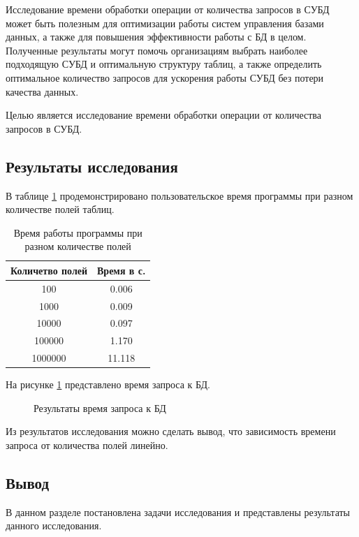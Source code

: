 Исследование времени обработки операции от количества запросов в СУБД может быть полезным для оптимизации работы систем управления базами данных, а также для повышения эффективности работы с БД в целом. Полученные результаты могут помочь организациям выбрать наиболее подходящую СУБД и оптимальную структуру таблиц, а также определить оптимальное количество запросов для ускорения работы СУБД без потери качества данных.

Целью является исследование времени обработки операции от количества запросов в
СУБД.

\subsection{Результаты исследования}

В таблице \ref{tab:time1} продемонстрировано пользовательское время программы
при разном количестве полей таблиц.

\begin{table}[ht!]
	\begin{center}

		\caption{Время работы программы при разном
			количестве
			полей}
		\label{tab:time1}
		\begin{tabular}{|c|c|}
			\hline
			Количетво полей & Время в с. \\
			\hline
			100             & 0.006      \\
			\hline
			1000            & 0.009      \\
			\hline
			10000           & 0.097      \\
			\hline
			100000          & 1.170      \\
			\hline
			1000000         & 11.118     \\
			\hline

		\end{tabular}
	\end{center}
\end{table}
\newpage
На рисунке \ref{graph:r} представлено время запроса к БД.

\begin{figure}[ht!]
	\begin{center}
		\captionsetup{singlelinecheck = false,
			justification=centerfirst}
		\centering
		\caption{Результаты время запроса к БД}
		\label{graph:r}
	\end{center}
\end{figure}

Из результатов исследования можно сделать вывод, что зависимость времени запроса от количества полей линейно.

\subsection*{Вывод}

В данном разделе постановлена задачи исследования и представлены результаты
данного исследования.